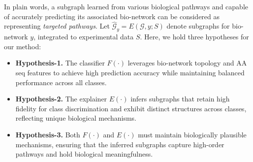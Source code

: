 In plain words, a subgraph learned from various biological pathways and capable of accurately predicting its associated bio-network can be considered as representing \textit{targeted pathways}.
Let $\hat{\mathcal{G}}_y = E(\mathcal{G}, y;S)$ denote subgraphs for bio-network $y$, integrated to experimental data $S$.
Here, we hold three hypotheses for our method:
\begin{itemize}[left=0pt]
    \item \textbf{Hypothesis-1.} 
    The classifier $F(\cdot)$  leverages bio-network topology and AA seq features to achieve high prediction accuracy while maintaining balanced performance across all classes.
    
    \item \textbf{Hypothesis-2.} The explainer $E(\cdot)$ infers subgraphs that retain high fidelity for class discrimination and exhibit distinct structures across classes, reflecting unique biological mechanisms.
    \item \textbf{Hypothesis-3.} 
    Both $F(\cdot)$ and $E(\cdot)$ must maintain biologically plausible mechanisms, ensuring that the inferred subgraphs capture high-order pathways and hold biological meaningfulness.
\end{itemize}

